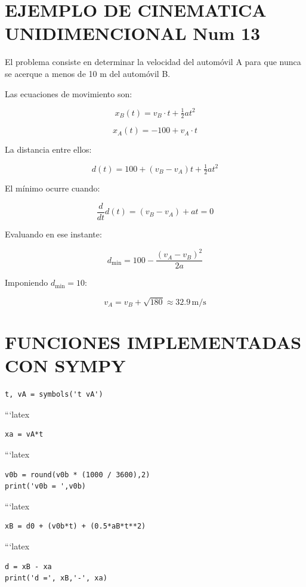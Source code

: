 \documentclass[12pt,a4paper]{article}
\begin{document}
\section{EJEMPLO DE CINEMATICA UNIDIMENCIONAL Num 13}
El problema consiste en determinar la velocidad del automóvil A para que nunca se acerque 
a menos de 10 m del automóvil B.



Las ecuaciones de movimiento son:




\[
x_B(t) = v_B \cdot t + \tfrac{1}{2} a t^2
\]




\[
x_A(t) = -100 + v_A \cdot t
\]



La distancia entre ellos:


\[
d(t) = 100 + (v_B - v_A) t + \tfrac{1}{2} a t^2
\]



El mínimo ocurre cuando:


\[
\frac{d}{dt} d(t) = (v_B - v_A) + a t = 0
\]



Evaluando en ese instante:


\[
d_{\min} = 100 - \frac{(v_A - v_B)^2}{2a}
\]



Imponiendo \(d_{\min} = 10\):


\[
v_A = v_B + \sqrt{180} \approx 32.9 \,\text{m/s}
\]

\section{FUNCIONES IMPLEMENTADAS CON SYMPY}

\begin{lstlisting}
t, vA = symbols('t vA')
\end{lstlisting}

```latex
\begin{lstlisting}
xa = vA*t
\end{lstlisting}

```latex
\begin{lstlisting}
v0b = round(v0b * (1000 / 3600),2)
print('v0b = ',v0b)
\end{lstlisting}

```latex
\begin{lstlisting}
xB = d0 + (v0b*t) + (0.5*aB*t**2)
\end{lstlisting}

```latex
\begin{lstlisting}
d = xB - xa
print('d =', xB,'-', xa)
\end{lstlisting}
\end{document}
